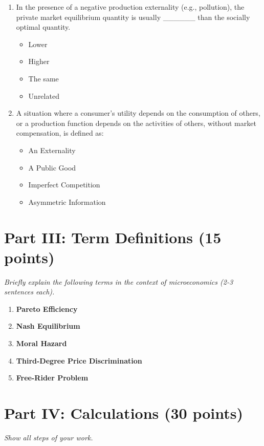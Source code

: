 \documentclass[12pt]{article}
\begin{document}
\begin{enumerate}
    \item In the presence of a negative production externality (e.g., pollution), the private market equilibrium quantity is usually \_\_\_\_\_\_ than the socially optimal quantity.
    \begin{itemize}
        \item[A.] Lower
        \item[B.] Higher
        \item[C.] The same
        \item[D.] Unrelated
    \end{itemize}

    \item A situation where a consumer's utility depends on the consumption of others, or a production function depends on the activities of others, without market compensation, is defined as:
    \begin{itemize}
        \item[A.] An Externality
        \item[B.] A Public Good
        \item[C.] Imperfect Competition
        \item[D.] Asymmetric Information
    \end{itemize}
\end{enumerate}

\section*{Part III: Term Definitions (15 points)}
\textit{Briefly explain the following terms in the context of microeconomics (2-3 sentences each).}

\begin{enumerate}
    \item \textbf{Pareto Efficiency}
    \item \textbf{Nash Equilibrium}
    \item \textbf{Moral Hazard}
    \item \textbf{Third-Degree Price Discrimination}
    \item \textbf{Free-Rider Problem}
\end{enumerate}

\section*{Part IV: Calculations (30 points)}
\textit{Show all steps of your work.}
\end{document}
